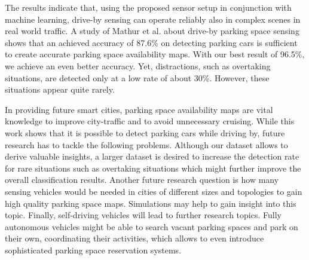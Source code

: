 The results indicate that, using the proposed sensor setup in conjunction with machine learning, drive-by sensing can operate reliably also in complex scenes in real world traffic. 
A study of Mathur et al. about drive-by parking space sensing \cite{Mathur:2010:PDS:1814433.1814448} shows that an achieved accuracy of 87.6\% on detecting parking cars is sufficient to create accurate parking space availability maps. With our best result of 96.5\%, we achieve an even better accuracy.
Yet, distractions, such as overtaking situations, are detected only at a low rate of about 30\%. However, these situations appear quite rarely.

In providing future smart cities, parking space availability maps are vital knowledge to improve city-traffic and to avoid unnecessary cruising.
While this work shows that it is possible to detect parking cars while driving by, future research has to tackle the following problems. Although our dataset allows to derive valuable insights, a larger dataset is desired to increase the detection rate for rare situations such as overtaking situations which might further improve the overall classification results. Another future research question is how many sensing vehicles would be needed in cities of different sizes and topologies to gain high quality parking space maps. Simulations may help to gain insight into this topic. Finally, self-driving vehicles will lead to further research topics. Fully autonomous vehicles might be able to search vacant parking spaces and park on their own, coordinating their activities, which allows to even introduce sophisticated parking space reservation systems.









